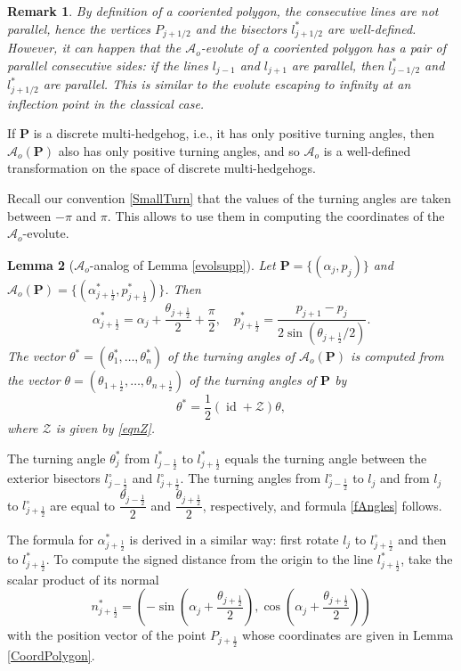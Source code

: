 \documentclass[12pt]{article}
\makeatletter
\newtheorem{lemma}{Lemma}[section]
\newtheorem{remark}[lemma]{Remark}
\renewenvironment{proof}[1][\proofname] 
{\par\pushQED{\qed}\normalfont\topsep6\p@\@plus6\p@\relax\trivlist\item[\hskip\labelsep\bfseries#1\@addpunct{.}]\ignorespaces}{\popQED\endtrivlist\@endpefalse}
\newcommand{\Aeo}{\mathcal{A}_o}
\renewcommand{\P}{\mathbf{P}}
\newcommand{\id}{\operatorname{id}}
\makeatother
\begin{document}
\begin{remark}
{\rm 
By definition of a cooriented polygon, the consecutive lines are not parallel, hence the vertices $P_{j+1/2}$ and the bisectors $l^*_{j+1/2}$ are well-defined. However, it can happen that the $\Aeo$-evolute of a cooriented polygon has a pair of parallel consecutive sides: if the lines $l_{j-1}$ and $l_{j+1}$ are parallel, then $l^*_{j-1/2}$ and $l^*_{j+1/2}$ are parallel. This is similar to the evolute escaping to infinity at an inflection point in the classical case. 
}
\end{remark}
 
 If $\P$ is a discrete multi-hedgehog, i.e., it has only positive turning angles, then $\Aeo(\P)$ also has only positive turning angles, and so $\Aeo$ is a well-defined transformation on the space of discrete multi-hedgehogs. 

Recall our convention \eqref{SmallTurn} that the values of the turning angles are taken between $-\pi$ and $\pi$. This allows to use them in computing the coordinates of the $\Aeo$-evolute.

\begin{lemma}[$\Aeo$-analog of Lemma \ref{evolsupp}]
\label{ParamBisect}
 Let $\P=\{(\alpha_{j},p_{j})\}$ and $\Aeo(\P)=\{(\alpha_{j+\frac12}^*,p_{j+\frac12}^*)\}$. Then
\[ \alpha^*_{j+\frac12} = \alpha_j + \frac{\theta_{j+\frac12}}2 + \frac{\pi}2, \quad p^*_{j+\frac12} = \frac{p_{j+1} - p_j}{2 \sin(\theta_{j+\frac12}/2)}. \]
The vector $\theta^*=(\theta_1^*,\dots, \theta_n^*)$ of the turning angles of $\Aeo(\P)$ is computed from the vector $\theta = \left(\theta_{1+\frac12}, \ldots, \theta_{n+\frac12}\right)$ of the turning angles of $\P$ by 
\begin{equation}
\label{fAngles}
\theta^* = \frac12 (\id +\mathcal{Z}) \theta,
\end{equation}
where $\mathcal{Z}$ is given by \eqref{eqnZ}. 
\end{lemma}

\begin{proof}
The turning angle $\theta^*_j$ from $l^*_{j-\frac12}$ to $l^*_{j+\frac12}$ equals the turning angle between the exterior bisectors $l^\circ_{j-\frac12}$ and $l^\circ_{j+\frac12}$. The turning angles from $l^\circ_{j-\frac12}$ to $l_j$ and from $l_j$ to $l^\circ_{j+\frac12}$ are equal to $\dfrac{\theta_{j-\frac12}}2$ and $\dfrac{\theta_{j+\frac12}}2$, respectively, and formula \eqref{fAngles} follows.
	
The formula for $\alpha^*_{j+\frac12}$ is derived in a similar way: first rotate $l_j$ to $l^\circ_{j+\frac12}$ and then to $l^*_{j+\frac12}$. To compute the signed distance from the origin to the line $l^*_{j+\frac12}$, take the scalar product of its normal
\[ n^*_{j+\frac12} = \left( -\sin\left( \alpha_j + \frac{\theta_{j+\frac12}}2 \right), \cos\left( \alpha_j + \frac{\theta_{j+\frac12}}2 \right) \right) \]
with the position vector of the point $P_{j+\frac12}$ whose coordinates are given in Lemma \ref{CoordPolygon}.
\end{proof}
\end{document}
